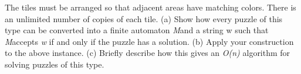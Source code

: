 \documentclass{knittingpattern}
\begin{document}
\vspace{0.5cm}

The tiles must be arranged so that adjacent areas have matching colors. There is an
unlimited number of copies of each tile.
\vspace{0.1cm}\flushleft
(a) Show how every puzzle of this type can be converted into a finite automaton \textit{M}and a string w such that \textit{M}accepts \textit{w} if and only if the puzzle has a solution.
\flushleft
(b) Apply your construction to the above instance.
\vspace{0.1cm}\flushleft
(c) Briefly describe how this gives an \textit{O(n)} algorithm for solving puzzles of this
type.
\end{document}
